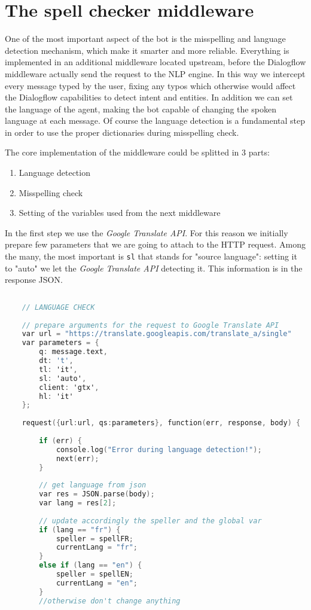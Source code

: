 	\section{The spell checker middleware}
	One of the most important aspect of the bot is the misspelling and language detection mechanism, which make it smarter and more reliable. Everything is implemented in an additional middleware located upstream, before the Dialogflow middleware actually send the request to the NLP engine. In this way we intercept every message typed by the user, fixing any typos which otherwise would affect the Dialogflow capabilities to detect intent and entities. In addition we can set the language of the agent, making the bot capable of changing the spoken language at each message. Of course the language detection is a fundamental step in order to use the proper dictionaries during misspelling check.
	
	The core implementation of the middleware could be splitted in 3 parts:
	\begin{enumerate}
		\item Language detection
		\item Misspelling check
		\item Setting of the variables used from the next middleware
	\end{enumerate}
	In the first step we use the \textit{Google Translate API}. For this reason we initially prepare few parameters that we are going to attach to the HTTP request. Among the many, the most important is \texttt{sl} that stands for "source language": setting it to "auto" we let the \textit{Google Translate API} detecting it. This information is in the response JSON.
	
	\begin{lstlisting}[language=C]
	
	// LANGUAGE CHECK
	
	// prepare arguments for the request to Google Translate API
	var url = "https://translate.googleapis.com/translate_a/single"
	var parameters = { 
		q: message.text, 
		dt: 't',
		tl: 'it',
		sl: 'auto',
		client: 'gtx',
		hl: 'it'
	};
	
	request({url:url, qs:parameters}, function(err, response, body) {
	
		if (err) {
			console.log("Error during language detection!");
			next(err);
		}
		
		// get language from json
		var res = JSON.parse(body);
		var lang = res[2];
		
		// update accordingly the speller and the global var 
		if (lang == "fr") {
			speller = spellFR;
			currentLang = "fr";
		}
		else if (lang == "en") {
			speller = spellEN;
			currentLang = "en";
		}
		//otherwise don't change anything
	\end{lstlisting}
	
